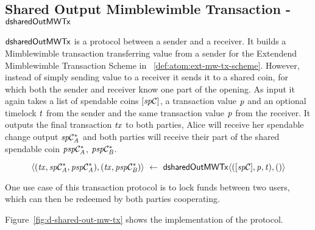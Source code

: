 \subsection{Shared Output Mimblewimble Transaction - $\mathsf{dsharedOutMWTx}$} \label{subsec:atom:shared-out-mw-tx}

$\mathsf{dsharedOutMWTx}$ is a protocol between a sender and a receiver.
It builds a Mimblewimble transaction transferring value from a sender for the Extendend Mimblewimble Transaction Scheme in ~\ref{def:atom:ext-mw-tx-scheme}.
However, instead of simply sending value to a receiver it sends it to a shared coin, for which both the sender and receiver know one part of the opening.
As input it again takes a list of spendable coins $[\mathit{sp}\mathcal{C}]$, a transaction value $\mathit{p}$ and an optional timelock $\mathit{t}$ from the sender and the same transaction value $\mathit{p}$ from the receiver.
It outputs the final transaction $\mathit{tx}$ to both parties, Alice will receive her spendable change output $\mathit{sp}\mathcal{C}_{\mathit{A}}^*$ and both parties will receive their part of the shared spendable coin $\mathit{psp}\mathcal{C}_{\mathit{A}}^*$, $\mathit{psp}\mathcal{C}_{\mathit{B}}^*$.

\[ \langle (\mathit{tx}, \mathit{sp}\mathcal{C}_{\mathit{A}}^*, \mathit{psp}\mathcal{C}_{\mathit{A}}^*), (\mathit{tx}, \mathit{psp}\mathcal{C}_{\mathit{B}}^*) \rangle ~\leftarrow~ \mathsf{dsharedOutMWTx} \langle([\mathit{sp}\mathcal{C}],\mathit{p},\mathit{t}), () \rangle \]

One use case of this transaction protocol is to lock funds between two users, which can then be redeemed by both parties cooperating.

Figure~\ref{fig:d-shared-out-mw-tx} shows the implementation of the protocol.

